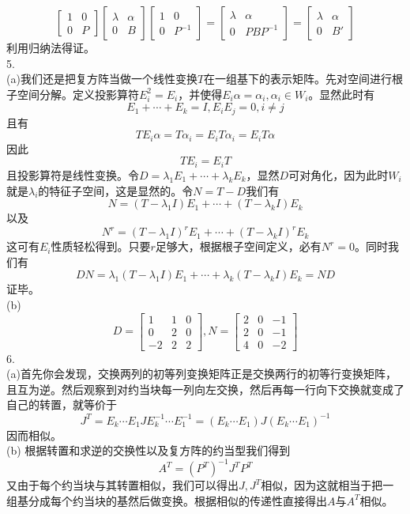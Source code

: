 \documentclass[utf8]{ctexart}
\begin{document}
\[\begin{bmatrix}
	1&0\\
	0&P
\end{bmatrix}\begin{bmatrix}
\lambda&\alpha\\
0&B
\end{bmatrix}\begin{bmatrix}
1&0\\
0&P^{-1}
\end{bmatrix}=\begin{bmatrix}
\lambda&\alpha\\
0&PBP^{-1}
\end{bmatrix}=\begin{bmatrix}
\lambda&\alpha\\
0&B'
\end{bmatrix}\]
利用归纳法得证。\\
5.\\
(a)我们还是把复方阵当做一个线性变换$T$在一组基下的表示矩阵。先对空间进行根子空间分解。定义投影算符$E_i^2=E_i$，并使得$E_i\alpha=\alpha_i,\alpha_i\in W_i$。显然此时有
\[E_1+\cdots+E_k=I,E_iE_j=0,i\neq j\]
且有
\[TE_i\alpha=T\alpha_i=E_iT\alpha_i=E_iT\alpha\]
因此
\[TE_i=E_iT\]
且投影算符是线性变换。令$D=\lambda_1E_1+\cdots+\lambda_kE_k$，显然$D$可对角化，因为此时$W_i$就是$\lambda_i$的特征子空间，这是显然的。令$N=T-D$我们有
\[N=(T-\lambda_1I)E_1+\cdots+(T-\lambda_kI)E_k\]
以及
\[N^r=(T-\lambda_1I)^rE_1+\cdots+(T-\lambda_kI)^rE_k\]
这可有$E_i$性质轻松得到。只要$r$足够大，根据根子空间定义，必有$N^r=0$。同时我们有
\[DN=\lambda_1(T-\lambda_1I)E_1+\cdots+\lambda_k(T-\lambda_kI)E_k=ND\]
证毕。\\
(b)
\[D=\begin{bmatrix}
	1&1&0\\
	0&2&0\\
	-2&2&2
\end{bmatrix},N=\begin{bmatrix}
2&0&-1\\
2&0&-1\\
4&0&-2
\end{bmatrix}\]
6.\\
(a)首先你会发现，交换两列的初等列变换矩阵正是交换两行的初等行变换矩阵，且互为逆。然后观察到对约当块每一列向左交换，然后再每一行向下交换就变成了自己的转置，就等价于
\[J^T=E_k\cdots E_1JE_k^{-1}\cdots E_1^{-1}=(E_k\cdots E_1)J(E_k\cdots E_1)^{-1}\]
因而相似。\\
(b)
根据转置和求逆的交换性以及复方阵的约当型我们得到
\[A^T=(P^T)^{-1}J^TP^T\]
又由于每个约当块与其转置相似，我们可以得出$J,J^T$相似，因为这就相当于把一组基分成每个约当块的基然后做变换。根据相似的传递性直接得出$A$与$A^T$相似。\\
\end{document}
